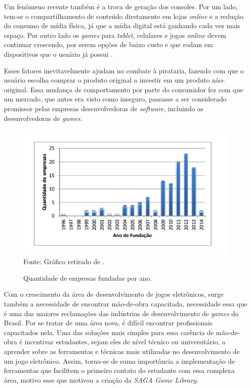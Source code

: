 Um fenômeno recente também é a troca de geração dos consoles. Por um lado, tem-se o compartilhamento de conteúdo diretamente em lojas \textit{online} e a redução do consumo de mídia física, já que a mídia digital está ganhando cada vez mais espaço. Por outro lado os \textit{games} para \textit{tablet}, celulares e jogos \textit{online} devem continuar crescendo, por serem opções de baixo custo e que rodam em dispositivos que o usuário já possui \cite{ESTADAO}.

Esses fatores inevitavelmente ajudam no combate à pirataria, fazendo com que o usuário escolha comprar o produto original a investir em um produto não-original. Essa mudança de comportamento por parte do consumidor fez com que um mercado, que antes era visto como inseguro, passasse a ser considerado promissor pelas empresas desenvolvedoras de \textit{software}, incluindo as desenvolvedoras de \textit{games}.
%
%
%
\begin{figure}[h]
    \centering
    \caption{Quantidade de empresas fundadas por ano.}
    \label{AnoFundacaoEmpresas}
    \includegraphics[scale = 0.80]{Imagens/AnoFundacaoEmpresas.png}
    \\ Fonte: Gráfico retirado de \cite{GEDIGames}.
\end{figure}
%
%
%
\par
Com o crescimento da área de desenvolvimento de jogos eletrônicos, surge também a necessidade de encontrar mão-de-obra capacitada, necessidade essa que é uma das maiores reclamações das indústrias de desenvolvimento de \textit{games} do Brasil. Por se tratar de uma área nova, é difícil encontrar profissionais capacitados nela. Uma das soluções mais simples para essa carência de mão-de-obra é incentivar estudantes, sejam eles de nível técnico ou universitário, a aprender sobre as ferramentas e técnicas mais utilizadas no desenvolvimento de um jogo eletrônico. Assim, torna-se de suma importância a implementação de ferramentas que facilitem o primeiro contato do estudante com essa complexa área, motivo esse que motivou a criação da \textit{SAGA Game Library}.
%
%
